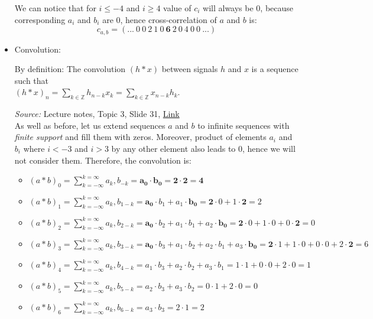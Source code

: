 \documentclass{article}
\begin{document}
\begin{itemize}
    We can notice that for $i\leq -4$ and $i\geq4$ value of $c_i$ will always be 0, because corresponding $a_i$ and $b_i$ are 0, hence cross-correlation of $a$ and $b$ is:
    $$c_{a,b}=(...\ 0\ 0\ 2\ 1\ 0\ \pmb{6}\ 2\ 0\ 4\ 0\ 0\ ...)$$
    
    \item Convolution:
    
    By definition: The convolution $(h*x)$ between signals $h$ and $x$ is a sequence such that\\ $(h*x)_n=\sum_{k\in\mathbb{Z}}h_{n-k}x_k=\sum_{k\in\mathbb{Z}}x_{n-k}h_k$.
    
    \emph{Source:} Lecture notes, Topic 3, Slide 31, \href{https://moodle.innopolis.university/pluginfile.php/142933/mod_resource/content/1/DSPt3spr22.pdf}{Link}\\
    
    As well as before, let us extend sequences $a$ and $b$ to infinite sequences with \emph{finite support} and fill them with zeros. Moreover, product of elements $a_i$ and $b_i$ where $i<-3$ and $i>3$ by any other element also leads to 0, hence we will not consider them. Therefore, the convolution is:
    \begin{itemize}
        \item $(a*b)_0=\sum^{k=\infty}_{k=-\infty}a_k,b_{-k}=
        \pmb{a_0}\cdot\pmb{b_0}=
        \pmb{2}\cdot\pmb{2}=\pmb{4}$
        \item $(a*b)_1=\sum^{k=\infty}_{k=-\infty}a_k,b_{1-k}=
        \pmb{a_0}\cdot b_1+a_1\cdot\pmb{b_0}=
        \pmb{2}\cdot0+1\cdot\pmb{2}=2$
        \item $(a*b)_2=\sum^{k=\infty}_{k=-\infty}a_k,b_{2-k}=
        \pmb{a_0}\cdot b_2+a_1\cdot b_1+a_2\cdot\pmb{b_0}=
        \pmb{2}\cdot0+1\cdot0+0\cdot\pmb{2}=0$
        \item $(a*b)_3=\sum^{k=\infty}_{k=-\infty}a_k,b_{3-k}=
        \pmb{a_0}\cdot b_3+a_1\cdot b_2+a_2\cdot b_1+a_3\cdot\pmb{b_0}=
        \pmb{2}\cdot1+1\cdot0+0\cdot0+2\cdot\pmb{2}=6$
        \item $(a*b)_4=\sum^{k=\infty}_{k=-\infty}a_k,b_{4-k}=
        a_1\cdot b_3+a_2\cdot b_2+a_3\cdot b_1=
        1\cdot1+0\cdot0+2\cdot0=1$
        \item $(a*b)_5=\sum^{k=\infty}_{k=-\infty}a_k,b_{5-k}=
        a_2\cdot b_3+a_3\cdot b_2=
        0\cdot1+2\cdot0=0$
        \item $(a*b)_6=\sum^{k=\infty}_{k=-\infty}a_k,b_{6-k}=
        a_3\cdot b_3=
        2\cdot1=2$
    \end{itemize}
    

\end{itemize}
\end{document}
